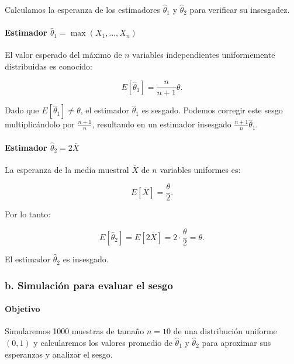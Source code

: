 \documentclass[
]{article}
\begin{document}
Calculamos la esperanza de los estimadores \(\hat{\theta}_1\) y \(\hat{\theta}_2\) para verificar su insesgadez.

\paragraph{\texorpdfstring{Estimador \(\hat{\theta}_1 = \max(X_1, \dots, X_n)\)}{Estimador \textbackslash hat\{\textbackslash theta\}\_1 = \textbackslash max(X\_1, \textbackslash dots, X\_n)}}\label{estimador-hattheta_1-maxx_1-dots-x_n}

El valor esperado del máximo de \(n\) variables independientes uniformemente distribuidas es conocido:

\[
E[\hat{\theta}_1] = \frac{n}{n+1} \theta.
\]

Dado que \(E[\hat{\theta}_1] \neq \theta\), el estimador \(\hat{\theta}_1\) es sesgado. Podemos corregir este sesgo multiplicándolo por \(\frac{n+1}{n}\), resultando en un estimador insesgado \(\frac{n+1}{n} \hat{\theta}_1\).

\paragraph{\texorpdfstring{Estimador \(\hat{\theta}_2 = 2\overline{X}\)}{Estimador \textbackslash hat\{\textbackslash theta\}\_2 = 2\textbackslash overline\{X\}}}\label{estimador-hattheta_2-2overlinex}

La esperanza de la media muestral \(\overline{X}\) de \(n\) variables uniformes es:

\[
E[\overline{X}] = \frac{\theta}{2}.
\]

Por lo tanto:

\[
E[\hat{\theta}_2] = E[2\overline{X}] = 2 \cdot \frac{\theta}{2} = \theta.
\]

El estimador \(\hat{\theta}_2\) es insesgado.

\subsubsection{b. Simulación para evaluar el sesgo}\label{b.-simulaciuxf3n-para-evaluar-el-sesgo}

\paragraph{Objetivo}\label{objetivo-1}

Simularemos 1000 muestras de tamaño \(n = 10\) de una distribución uniforme \((0, 1)\) y calcularemos los valores promedio de \(\hat{\theta}_1\) y \(\hat{\theta}_2\) para aproximar sus esperanzas y analizar el sesgo.
\end{document}
